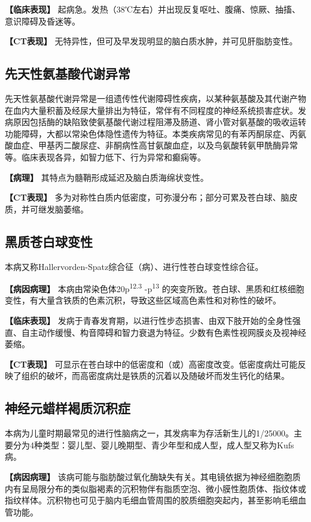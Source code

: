 \textbf{【临床表现】}
起病急。发热（38℃左右）并出现反复呕吐、腹痛、惊厥、抽搐、意识障碍及昏迷等。

\textbf{【CT表现】}
无特异性，但可及早发现明显的脑白质水肿，并可见肝脂肪变性。

\subsection{先天性氨基酸代谢异常}

先天性氨基酸代谢异常是一组遗传性代谢障碍性疾病，以某种氨基酸及其代谢产物在血内大量积蓄及经尿大量排出为特征，常伴有不同程度的神经系统损害症状。发病原因包括酶的缺陷致使氨基酸代谢过程阻滞及肠道、肾小管对氨基酸的吸收运转功能障碍，大都以常染色体隐性遗传为特征。本类疾病常见的有苯丙酮尿症、丙氨酸血症、甲基丙二酸尿症、非酮病性高甘氨酸血症，以及鸟氨酸转氨甲酰酶异常等。临床表现各异，如智力低下、行为异常和癫痫等。

\textbf{【病理】} 其特点为髓鞘形成延迟及脑白质海绵状变性。

\textbf{【CT表现】}
多为对称性白质内低密度，可弥漫分布；部分可累及苍白球、脑皮质，并可继发脑萎缩。

\subsection{黑质苍白球变性}

本病又称Hallervorden-Spatz综合征（病）、进行性苍白球变性综合征。

\textbf{【病因病理】} 本病由常染色体20p\textsuperscript{12.3}
-p\textsuperscript{13}
的突变所致。苍白球、黑质和红核细胞变性，有大量含铁质的色素沉积，导致这些区域高色素性和对称性的破坏。

\textbf{【临床表现】}
发病于青春发育期，以进行性步态损害、由双下肢开始的全身性强直、自主动作缓慢、构音障碍和智力衰退为特征。少数有色素性视网膜炎及视神经萎缩。

\textbf{【CT表现】}
可显示在苍白球中的低密度和（或）高密度改变。低密度病灶可能反映了组织的破坏，而高密度病灶是铁质的沉着以及随破坏而发生钙化的结果。

\subsection{神经元蜡样褐质沉积症}

本病为儿童时期最常见的进行性脑病之一，其发病率为存活新生儿的1/25000。主要分为4种类型：婴儿型、婴儿晚期型、青少年型和成人型，成人型又称为Kufs病。

\textbf{【病因病理】}
该病可能与脂肪酸过氧化酶缺失有关。其电镜依据为神经细胞胞质内有呈局限分布的类似脂褐素的沉积物伴有脂质空泡、微小膜性胞质体、指纹体或指纹样体。沉积物也可见于脑内毛细血管周围的胶质细胞突起内，甚至影响毛细血管功能。


